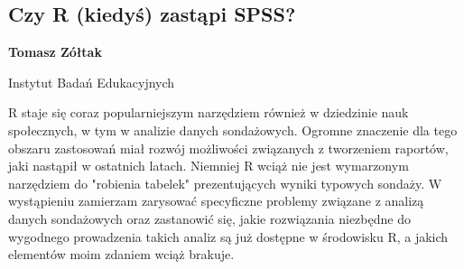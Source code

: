 \documentclass[\main/boa.tex]{subfiles}
\begin{document}
\subsection{Czy R (kiedyś) zastąpi SPSS?}

\begin{minipage}{0.915\textwidth}
	\centering
  {\bf {}  Tomasz Zółtak}
\end{minipage}



\begin{affiliations}
\begin{minipage}{0.915\textwidth}
\centering
Instytut Badań Edukacyjnych \\[-2pt]
\end{minipage}
\end{affiliations}

\vskip 0.3cm

 R staje się coraz popularniejszym narzędziem również w dziedzinie nauk społecznych, w tym w analizie danych sondażowych. Ogromne znaczenie dla tego obszaru zastosowań miał rozwój możliwości związanych z tworzeniem raportów, jaki nastąpił w ostatnich latach. Niemniej R wciąż nie jest wymarzonym narzędziem do "robienia tabelek" prezentujących wyniki typowych sondaży. W wystąpieniu zamierzam zarysować specyficzne problemy związane z analizą danych sondażowych oraz zastanowić się, jakie rozwiązania niezbędne do wygodnego prowadzenia takich analiz są już dostępne w środowisku R, a jakich elementów moim zdaniem wciąż brakuje. 
\end{document}
